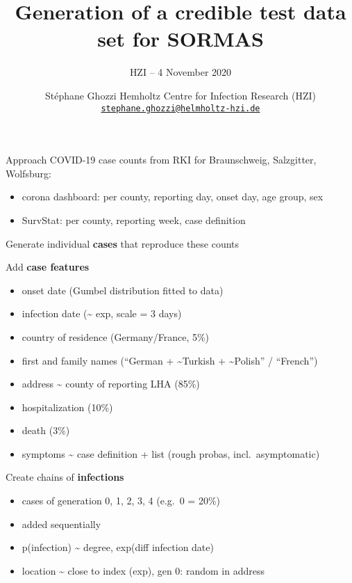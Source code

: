 \documentclass[
  8pt,
  ignorenonframetext,
]{beamer}
\title{Generation of a credible test data set for SORMAS}
\subtitle{HZI -- 4 November 2020}
\author{\newline \newline Stéphane Ghozzi \newline \small Hemholtz
Centre for Infection Research (HZI)
\newline \href{mailto:stephane.ghozzi@helmholtz-hzi.de}{\nolinkurl{stephane.ghozzi@helmholtz-hzi.de}}
\normalsize}
\date{}
\providecommand{\tightlist}{%
  \setlength{\itemsep}{0pt}\setlength{\parskip}{0pt}}
\begin{document}
\frame{\titlepage}

\begin{frame}{Approach}
\protect\hypertarget{approach}{}
COVID-19 case counts from RKI for Braunschweig, Salzgitter, Wolfsburg:

\begin{itemize}
\tightlist
\item
  corona dashboard: per county, reporting day, onset day, age group, sex
\item
  SurvStat: per county, reporting week, case definition
\end{itemize}

\vspace{1.5cm}

Generate individual \textbf{cases} that reproduce these counts
\end{frame}

\begin{frame}
Add \textbf{case features}

\begin{itemize}
\tightlist
\item
  onset date (Gumbel distribution fitted to data)
\item
  infection date (\textasciitilde{} exp, scale = 3 days)
\item
  country of residence (Germany/France, 5\%)
\item
  first and family names (``German + \textasciitilde Turkish +
  \textasciitilde Polish'' / ``French'')
\item
  address \textasciitilde{} county of reporting LHA (85\%)
\item
  hospitalization (10\%)
\item
  death (3\%)
\item
  symptoms \textasciitilde{} case definition + list (rough probas,
  incl.~asymptomatic)
\end{itemize}
\end{frame}

\begin{frame}
Create chains of \textbf{infections}

\begin{itemize}
\tightlist
\item
  cases of generation 0, 1, 2, 3, 4 (e.g.~0 = 20\%)
\item
  added sequentially
\item
  p(infection) \textasciitilde{} degree, exp(diff infection date)
\item
  location \textasciitilde{} close to index (exp), gen 0: random in
  address
\end{itemize}
\end{frame}
\end{document}
